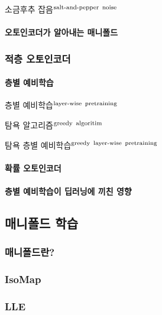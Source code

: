 \documentclass [12pt] {oblivoir}
\let\oldsubsubsection=\subsubsection
\renewcommand{\subsubsection}
{
  \filbreak
  \oldsubsubsection
}
\begin{document}
소금후추 잡음$^{\text{salt-and-pepper\, noise}}$

\paragraph*{오토인코더가 알아내는 매니폴드}\mbox{}

\subsubsection{적층 오토인코더}

\paragraph*{층별 예비학습}\mbox{}

층별 예비학습$^{\text{layer-wise\, pretraining}}$

탐욕 알고리즘$^{\text{greedy\, algoritim}}$

탐욕 층별 예비학습$^{\text{greedy\, layer-wise\, pretraining}}$

\vspace{3mm}

\paragraph*{확률 오토인코더}\mbox{}

\vspace{3mm}

\paragraph*{층별 예비학습이 딥러닝에 끼친 영향}\mbox{}

\vspace{3mm}

\subsection{매니폴드 학습}

\subsubsection{매니폴드란?}

\subsubsection{IsoMap}

\subsubsection{LLE}
\end{document}
